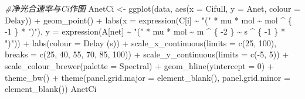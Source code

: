 \documentclass[
]{krantz}
\makeatletter
\newenvironment{Shaded}{\begin{snugshade}}{\end{snugshade}}
\newcommand{\AttributeTok}[1]{\textcolor[rgb]{0.77,0.63,0.00}{#1}}
\newcommand{\CommentTok}[1]{\textcolor[rgb]{0.56,0.35,0.01}{\textit{#1}}}
\newcommand{\DecValTok}[1]{\textcolor[rgb]{0.00,0.00,0.81}{#1}}
\newcommand{\FunctionTok}[1]{\textcolor[rgb]{0.00,0.00,0.00}{#1}}
\newcommand{\NormalTok}[1]{#1}
\newcommand{\OtherTok}[1]{\textcolor[rgb]{0.56,0.35,0.01}{#1}}
\newcommand{\SpecialCharTok}[1]{\textcolor[rgb]{0.00,0.00,0.00}{#1}}
\newcommand{\StringTok}[1]{\textcolor[rgb]{0.31,0.60,0.02}{#1}}
\newenvironment{kframe}{%
\medskip{}
\setlength{\fboxsep}{.8em}
 \def\at@end@of@kframe{}%
 \ifinner\ifhmode%
  \def\at@end@of@kframe{\end{minipage}}%
  \begin{minipage}{\columnwidth}%
 \fi\fi%
 \def\FrameCommand##1{\hskip\@totalleftmargin \hskip-\fboxsep
 \colorbox{shadecolor}{##1}\hskip-\fboxsep
     \hskip-\linewidth \hskip-\@totalleftmargin \hskip\columnwidth}%
 \MakeFramed {\advance\hsize-\width
   \@totalleftmargin\z@ \linewidth\hsize
   \@setminipage}}%
 {\par\unskip\endMakeFramed%
 \at@end@of@kframe}
\renewenvironment{Shaded}{\begin{kframe}}{\end{kframe}}
\makeatother
\begin{document}
\begin{Shaded}
\begin{Highlighting}[]
\CommentTok{\#净光合速率与Ci作图}
\NormalTok{AnetCi }\OtherTok{\textless{}{-}} \FunctionTok{ggplot}\NormalTok{(data, }\FunctionTok{aes}\NormalTok{(}\AttributeTok{x =}\NormalTok{ Cifull, }\AttributeTok{y =}\NormalTok{ Anet, }\AttributeTok{colour =}\NormalTok{ Delay)) }\SpecialCharTok{+}
  \FunctionTok{geom\_point}\NormalTok{() }\SpecialCharTok{+}
  \FunctionTok{labs}\NormalTok{(}\AttributeTok{x =} \FunctionTok{expression}\NormalTok{(C[i] }\SpecialCharTok{\textasciitilde{}} \StringTok{"("} \SpecialCharTok{*}\NormalTok{ mu }\SpecialCharTok{*}\NormalTok{ mol }\SpecialCharTok{\textasciitilde{}}\NormalTok{ mol }\SpecialCharTok{\^{}}\NormalTok{ \{}
    \SpecialCharTok{{-}}\DecValTok{1}
\NormalTok{  \} }\SpecialCharTok{*} \StringTok{")"}\NormalTok{),}
  \AttributeTok{y =} \FunctionTok{expression}\NormalTok{(A[net] }\SpecialCharTok{\textasciitilde{}} \StringTok{"("} \SpecialCharTok{*}\NormalTok{ mu }\SpecialCharTok{*}\NormalTok{ mol }\SpecialCharTok{\textasciitilde{}}\NormalTok{ m }\SpecialCharTok{\^{}}\NormalTok{ \{}
    \SpecialCharTok{{-}}\DecValTok{2}
\NormalTok{  \} }\SpecialCharTok{\textasciitilde{}}\NormalTok{ s }\SpecialCharTok{\^{}}\NormalTok{ \{}
    \SpecialCharTok{{-}}\DecValTok{1}
\NormalTok{  \} }\SpecialCharTok{*} \StringTok{")"}\NormalTok{)) }\SpecialCharTok{+}
  \FunctionTok{labs}\NormalTok{(}\AttributeTok{colour =} \StringTok{\textquotesingle{}Delay (s)\textquotesingle{}}\NormalTok{) }\SpecialCharTok{+}
  \FunctionTok{scale\_x\_continuous}\NormalTok{(}\AttributeTok{limits =} \FunctionTok{c}\NormalTok{(}\DecValTok{25}\NormalTok{, }\DecValTok{100}\NormalTok{),}
                     \AttributeTok{breaks =} \FunctionTok{c}\NormalTok{(}\DecValTok{25}\NormalTok{, }\DecValTok{40}\NormalTok{, }\DecValTok{55}\NormalTok{, }\DecValTok{70}\NormalTok{, }\DecValTok{85}\NormalTok{, }\DecValTok{100}\NormalTok{)) }\SpecialCharTok{+}
  \FunctionTok{scale\_y\_continuous}\NormalTok{(}\AttributeTok{limits =} \FunctionTok{c}\NormalTok{(}\SpecialCharTok{{-}}\DecValTok{5}\NormalTok{, }\DecValTok{5}\NormalTok{)) }\SpecialCharTok{+}
  \FunctionTok{scale\_colour\_brewer}\NormalTok{(}\AttributeTok{palette =} \StringTok{\textquotesingle{}Spectral\textquotesingle{}}\NormalTok{) }\SpecialCharTok{+}
  \FunctionTok{geom\_hline}\NormalTok{(}\AttributeTok{yintercept =} \DecValTok{0}\NormalTok{) }\SpecialCharTok{+}
  \FunctionTok{theme\_bw}\NormalTok{() }\SpecialCharTok{+}
  \FunctionTok{theme}\NormalTok{(}\AttributeTok{panel.grid.major =} \FunctionTok{element\_blank}\NormalTok{(),}
        \AttributeTok{panel.grid.minor =} \FunctionTok{element\_blank}\NormalTok{())}
\NormalTok{AnetCi}
\end{Highlighting}
\end{Shaded}
\end{document}
